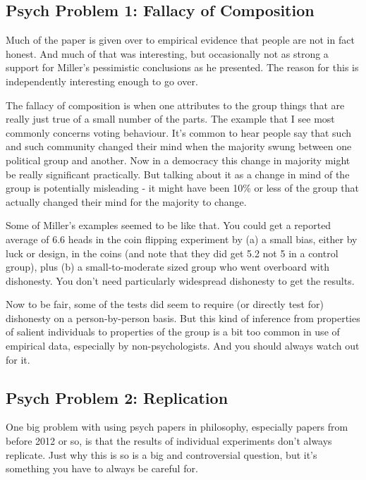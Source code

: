 \documentclass[
]{article}
\begin{document}
\hypertarget{psych-problem-1-fallacy-of-composition}{%
\subsection{Psych Problem 1: Fallacy of
Composition}\label{psych-problem-1-fallacy-of-composition}}

Much of the paper is given over to empirical evidence that people are
not in fact honest. And much of that was interesting, but occasionally
not as strong a support for Miller's pessimistic conclusions as he
presented. The reason for this is independently interesting enough to go
over.

The fallacy of composition is when one attributes to the group things
that are really just true of a small number of the parts. The example
that I see most commonly concerns voting behaviour. It's common to hear
people say that such and such community changed their mind when the
majority swung between one political group and another. Now in a
democracy this change in majority might be really significant
practically. But talking about it as a change in mind of the group is
potentially misleading - it might have been 10\% or less of the group
that actually changed their mind for the majority to change.

Some of Miller's examples seemed to be like that. You could get a
reported average of 6.6 heads in the coin flipping experiment by (a) a
small bias, either by luck or design, in the coins (and note that they
did get 5.2 not 5 in a control group), plus (b) a small-to-moderate
sized group who went overboard with dishonesty. You don't need
particularly widespread dishonesty to get the results.

Now to be fair, some of the tests did seem to require (or directly test
for) dishonesty on a person-by-person basis. But this kind of inference
from properties of salient individuals to properties of the group is a
bit too common in use of empirical data, especially by
non-psychologists. And you should always watch out for it.

\hypertarget{psych-problem-2-replication}{%
\subsection{Psych Problem 2:
Replication}\label{psych-problem-2-replication}}

One big problem with using psych papers in philosophy, especially papers
from before 2012 or so, is that the results of individual experiments
don't always replicate. Just why this is so is a big and controversial
question, but it's something you have to always be careful for.
\end{document}
